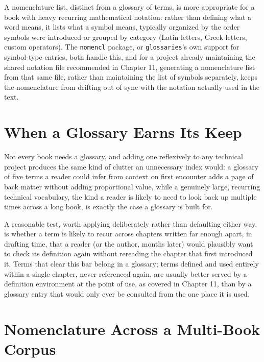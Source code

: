 A nomenclature list, distinct from a glossary of terms, is more appropriate for a book with heavy recurring mathematical notation: rather than defining what a word means, it lists what a symbol means, typically organized by the order symbols were introduced or grouped by category (Latin letters, Greek letters, custom operators). The \texttt{nomencl} package, or \texttt{glossaries}'s own support for symbol-type entries, both handle this, and for a project already maintaining the shared notation file recommended in Chapter 11, generating a nomenclature list from that same file, rather than maintaining the list of symbols separately, keeps the nomenclature from drifting out of sync with the notation actually used in the text.

\hypertarget{when-a-glossary-earns-its-keep}{%
\section{When a Glossary Earns Its Keep}\label{when-a-glossary-earns-its-keep}}

Not every book needs a glossary, and adding one reflexively to any technical project produces the same kind of clutter an unnecessary index would: a glossary of five terms a reader could infer from context on first encounter adds a page of back matter without adding proportional value, while a genuinely large, recurring technical vocabulary, the kind a reader is likely to need to look back up multiple times across a long book, is exactly the case a glossary is built for.

A reasonable test, worth applying deliberately rather than defaulting either way, is whether a term is likely to recur across chapters written far enough apart, in drafting time, that a reader (or the author, months later) would plausibly want to check its definition again without rereading the chapter that first introduced it. Terms that clear this bar belong in a glossary; terms defined and used entirely within a single chapter, never referenced again, are usually better served by a definition environment at the point of use, as covered in Chapter 11, than by a glossary entry that would only ever be consulted from the one place it is used.

\hypertarget{nomenclature-across-a-multi-book-corpus}{%
\section{Nomenclature Across a Multi-Book Corpus}\label{nomenclature-across-a-multi-book-corpus}}


